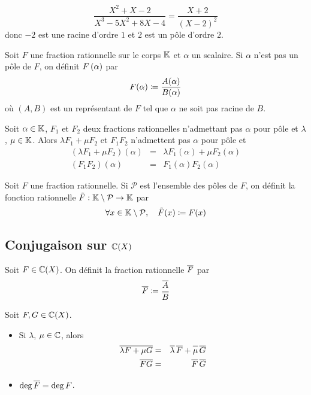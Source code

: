 \documentclass{magnolia}
\begin{document}
\begin{sol}
$$\frac{X^2+X-2}{X^3-5X^2+8X-4}=\frac{X+2}{(X-2)^2}$$ donc $-2$ est une racine d'ordre $1$ et $2$ est un pôle d'ordre $2$.
\end{sol}

\begin{definition}
Soit $F$ une fraction rationnelle sur le corps $\mathbb{K}$ et $\alpha$ un
scalaire. Si $\alpha$ n'est pas un pôle de $F$, on définit $F\left(\alpha\right)$ par
\[F(\alpha)\coloneqq\frac{A(\alpha)}{B(\alpha)}\]
où $(A,B)$ est un représentant de $F$ tel que $\alpha$ ne soit pas
racine de $B$.
\end{definition}

\begin{proposition}
Soit $\alpha\in\mathbb{K}$, $F_1$ et $F_2$ deux fractions rationnelles
n'admettant pas $\alpha$ pour pôle et $\lambda$, $\mu\in\mathbb{K}$.
Alors $\lambda F_1+\mu F_2$ et $F_1 F_2$ n'admettent pas
$\alpha$ pour pôle et
\begin{eqnarray*}
(\lambda F_1+\mu F_2)(\alpha) &=& \lambda F_1(\alpha)+\mu F_2(\alpha)\\
(F_1 F_2)(\alpha) &=& F_1(\alpha) F_2(\alpha)
\end{eqnarray*}
\end{proposition}

\begin{definition}
Soit $F$ une fraction rationnelle. Si $\mathcal{P}$ est l'ensemble des pôles de $F$,
on définit la fonction rationnelle $\tilde{F}:\mathbb{K}\setminus\mathcal{P}\to\mathbb{K}$ par
\[\forall x\in\mathbb{K}\setminus\mathcal{P} ,\quad \tilde{F}(x)\coloneqq F(x)\] 
\end{definition}


\subsection{Conjugaison sur $\fracC$}

\begin{definition}
Soit $F\in\fracC$. On définit la fraction rationnelle $\overline{F}$ par
\[\overline{F}\coloneqq\frac{\overline{A}}{\overline{B}}\]
\end{definition}

\begin{proposition}
Soit $F,G\in\fracC$.
\begin{itemize}
\item Si $\lambda$, $\mu\in\mathbb{C}$, alors
\begin{eqnarray*}
\conj{\lambda F+\mu G}&=&\conj{\lambda}\, \conj{F}+\conj{\rule{0pt}{6.75pt}\mu}\, \conj{G}\\
\conj{F G}&=&\conj{F}\,\conj{G}
\end{eqnarray*}
\item $\deg\overline{F}=\deg F$.
\end{itemize}
\end{proposition}
\end{document}
